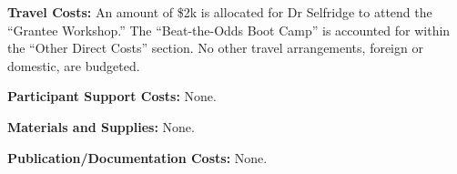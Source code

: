 \documentclass[11pt]{article}
\begin{document}
{\bf Travel Costs:} An amount of \$2k is allocated for Dr Selfridge to attend the ``Grantee Workshop.''  The ``Beat-the-Odds Boot Camp'' is accounted for within the ``Other Direct Costs'' section.  No other travel arrangements, foreign or domestic, are budgeted.


{\bf Participant Support Costs:} None.


{\bf Materials and Supplies:} None.


{\bf Publication/Documentation Costs:} None.
\end{document}
